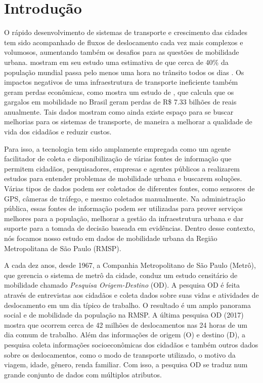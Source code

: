 \chapter{Introdução}
\label{cap:introducao}

O rápido  desenvolvimento de sistemas de transporte e crescimento das cidades
tem sido acompanhado de fluxos de deslocamento cada vez mais complexos e
volumosos, aumentando também os desafios para as questões de mobilidade urbana.
\cite{Zhang2011} mostram em seu estudo uma estimativa de que cerca de 40\% da
população mundial passa pelo menos uma hora no trânsito todos os dias
\citep{Zhang2011}. Os impactos negativos de uma infraestrutura de transporte
ineficiente também geram perdas econômicas, como mostra um estudo de \cite{ricardo:18}, que
calcula que os gargalos em mobilidade no Brasil geram perdas de R\$ 7.33
bilhões de reais anualmente. Tais dados mostram como ainda existe espaço para se
buscar melhorias para os sistemas de transporte, de maneira a melhorar a
qualidade de vida dos cidadãos e reduzir custos.

Para isso, a tecnologia tem sido amplamente empregada como um agente
facilitador de coleta e disponibilização de várias fontes de informação que
permitem cidadãos, pesquisadores, empresas e agentes públicos a realizarem
estudos para entender problemas de mobilidade urbana e buscarem soluções.
Várias tipos de dados podem ser coletados de diferentes fontes, como sensores
de GPS, câmeras de tráfego, e mesmo coletados manualmente. Na administração
pública, essas fontes de informação podem ser utilizadas para prover serviços
melhores para a população, melhorar a gestão da infraestrutura urbana e dar
suporte para a tomada de decisão baseada em evidências. Dentro desse
contexto, nós focamos nosso estudo em dados de mobilidade urbana da Região
Metropolitana de S\~ao Paulo (RMSP).

A cada dez anos, desde 1967, a Companhia Metropolitano de São Paulo (Metrô),
que gerencia o sistema de metrô da cidade, conduz um estudo censitário de
mobilidade chamado \emph{Pesquisa Origem-Destino} (OD). A pesquisa OD é feita
através de entrevistas aos cidadãos e coleta dados sobre suas vidas e
atividades de deslocamento em um dia típico de trabalho. O resultado é um amplo
panorama social e de mobilidade da população na RMSP. A última pesquisa OD
(2017) mostra que ocorrem cerca de 42 milhões de deslocamentos nas 24 horas de
um dia comum de trabalho. Além das informações de origem (O) e destino (D), a
pesquisa coleta informações socioeconômicas dos cidadãos e também outros dados
sobre os deslocamentos, como o modo de transporte utilizado, o motivo da
viagem, idade, gênero, renda familiar. Com isso, a pesquisa OD se traduz num
grande conjunto de dados com múltiplos atributos.

